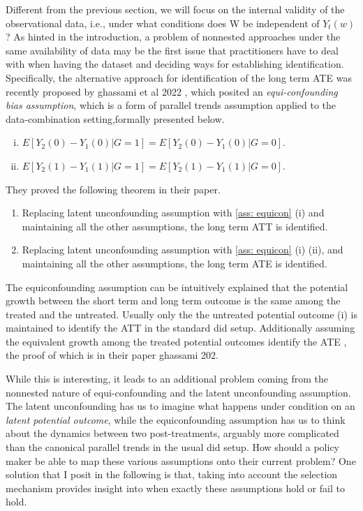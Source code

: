 \documentclass[uplatex,dvipdfmx]{jsarticle}
\begin{document}
Different from the previous section, we will focus on the internal validity of the observational data, i.e., under what conditions does W be independent of $Y_t(w)$ ?
As hinted in the introduction, a problem of nonnested approaches under the same availability of data may be the first issue that practitioners have to deal with when having the dataset and deciding ways for establishing identification.
Specifically, the alternative approach for identification of the long term ATE was recently proposed by %
{ghassami et al 2022} , which posited an \textit{equi-confounding bias assumption}, which is a form of parallel trends assumption applied to the data-combination setting,formally presented below.
\begin{assumption}\mbox{}
\label{ass: equicon}
\begin{enumerate}[(i)]
    \item $E[Y_2(0) - Y_1(0)| G= 1] = E[Y_2(0) - Y_1(0) | G=0]$.
    \item $ E[Y_2(1) - Y_1(1)| G= 1] = E[Y_2(1) - Y_1(1) | G=0]$.
\end{enumerate}
\end{assumption}
They proved the following theorem in their paper.
 \begin{theorem}\mbox{}
     \begin{enumerate}
         \item Replacing latent unconfounding assumption with \ref{ass: equicon} (i) and maintaining all the other assumptions, the long term ATT is identified.
         \item Replacing latent unconfounding assumption with \ref{ass: equicon} (i) (ii), and maintaining all the other assumptions, the long term ATE is identified.
     \end{enumerate}
 \end{theorem}
 
The equiconfounding assumption can be intuitively explained that the potential growth between the short term and long term outcome is the same among the treated and the untreated. Usually only the the untreated potential outcome (i) is maintained to identify the ATT in the standard did setup. Additionally assuming the equivalent growth among the treated potential outcomes identify the ATE , the proof of which is in their paper %
{ghassami 202}.

While this is interesting, it leads to an additional problem coming from the nonnested nature of equi-confounding and the latent unconfounding assumption. The latent unconfounding has us to imagine what happens under condition on an \textit{latent potential outcome}, while the equiconfounding assumption has us to think about the dynamics between two post-treatments, arguably more complicated than the canonical parallel trends in the usual did setup.  How should a policy maker be able to map these various assumptions onto their current problem? One solution that I posit in the following is that, taking into account the selection mechanism provides insight into when exactly these assumptions hold or fail to hold.
\end{document}
